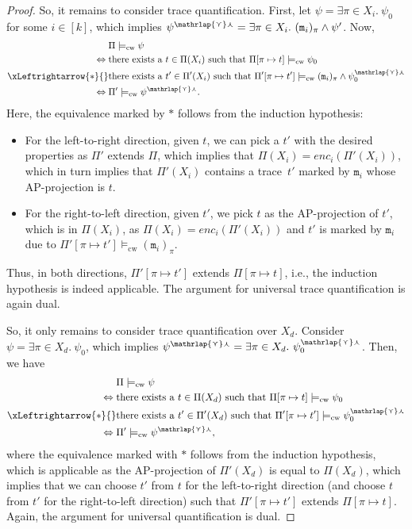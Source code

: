 \documentclass[dvipsnames,10pt,a4paper]{amsart}
\theoremstyle{definition}
\theoremstyle{remark}
\newcommand{\ap}[0]{\mathrm{AP}}
\newcommand{\unidisvar}{X_d}
\newcommand{\smalar}{{\mathrlap{\curlyvee}\curlywedge}}
\newcommand{\cw}{\mathrm{cw}}
\newcommand{\marker}{\texttt{m}}
\newcommand{\enc}{\mathit{enc}}
\begin{document}
\begin{proof}
So, it remains to consider trace quantification. 
First, let $\psi= \exists \pi \in X_i.\ \psi_0$ for some $i \in [k]$, which implies
$\psi^{\smalar} = \exists \pi \in X_i.\ (\marker_{i})_{\pi} \wedge \psi'$.
Now,
\begin{align*}
{}&{}\Pi \models_\cw \psi \\
\Leftrightarrow{}&{}
\text{there exists a $t \in \Pi(X_i)$ such that } \Pi[\pi \mapsto t] \models_\cw \psi_0 \\
\xLeftrightarrow{\ast}{}&{}
\text{there exists a $t' \in \Pi'(X_i)$ such that } \Pi'[\pi \mapsto t'] \models_\cw (\marker_{i})_\pi \wedge\psi_0^{\smalar} \\
\Leftrightarrow{}&{}
\Pi' \models_\cw  \psi^{\smalar}.
\end{align*}
Here, the equivalence marked by $\ast$ follows from the induction hypothesis: 
\begin{itemize}
    \item For the left-to-right direction, given $t$, we can pick a $t'$ with the desired properties as $\Pi'$ extends $\Pi$, which implies that $\Pi(X_i) = \enc_i(\Pi'(X_i))$, which in turn implies that $\Pi'(X_i)$ contains a trace~$t'$ marked by $\marker_{i}$ whose $\ap$-projection is $t$.
    \item For the right-to-left direction, given $t'$, we pick $t$ as the $\ap$-projection of $t'$, which is in $\Pi(X_i)$, as $\Pi(X_i) = \enc_i(\Pi'(X_i))$ and $t'$ is marked by $\marker_i$ due to $\Pi'[\pi \mapsto t']  \models_\cw (\marker_{i})_\pi$.
\end{itemize}
Thus, in both directions, $\Pi'[\pi \mapsto t']$ extends $\Pi[\pi \mapsto t] $, i.e., the induction hypothesis is indeed applicable.
The argument for universal trace quantification is again dual. 

So, it only remains to consider trace quantification over $\unidisvar$.
Consider $\psi = \exists \pi \in \unidisvar.\ \psi_0$, which implies $\psi^{\smalar} = \exists \pi \in \unidisvar.\ \psi_0^{\smalar}$.
Then, we have
\begin{align*}
{}&{}\Pi\models_\cw \psi \\
\Leftrightarrow{}&{} \text{there exists a $t \in \Pi(\unidisvar)$ such that $\Pi[\pi \mapsto t] \models_\cw \psi_0$} \\
\xLeftrightarrow{\ast}{}&{} \text{there exists a $t' \in \Pi'(\unidisvar)$ such that $\Pi'[\pi \mapsto t'] \models_\cw \psi_0^{\smalar}$}\\
\Leftrightarrow{}&{} \Pi'\models_\cw \psi^{\smalar}
,    
\end{align*}
where the equivalence marked with $\ast$ follows from the induction hypothesis, which is applicable as the $\ap$-projection of $\Pi'(\unidisvar)$ is equal to $\Pi(\unidisvar)$, which implies that we can choose $t'$ from 
$t$ for the left-to-right direction (and choose $t$ from 
$t'$ for the right-to-left direction) such that $\Pi'[\pi \mapsto t']$ extends $\Pi[\pi \mapsto t]$.
Again, the argument for universal quantification is dual.
\end{proof}
\end{document}
